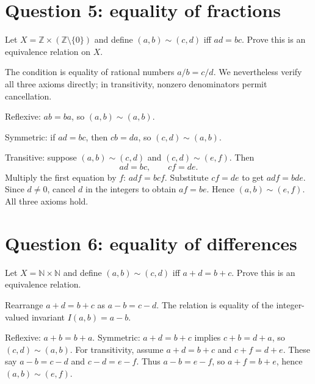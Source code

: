 \documentclass[11pt,openany]{book}
\newcommand{\N}{\mathbb N}\newcommand{\Z}{\mathbb Z}
\begin{document}
\section{Question 5: equality of fractions}
\begin{questionbox}
Let $X=\Z\times(\Z\setminus\{0\})$ and define $(a,b)\sim(c,d)$ iff $ad=bc$. Prove this is an equivalence relation on $X$.
\end{questionbox}
\begin{approachbox}
The condition is equality of rational numbers $a/b=c/d$. We nevertheless verify all three axioms directly; in transitivity, nonzero denominators permit cancellation.
\end{approachbox}
\begin{solutionbox}
Reflexive: $ab=ba$, so $(a,b)\sim(a,b)$.

Symmetric: if $ad=bc$, then $cb=da$, so $(c,d)\sim(a,b)$.

Transitive: suppose $(a,b)\sim(c,d)$ and $(c,d)\sim(e,f)$. Then
\[
ad=bc,\qquad cf=de.
\]
Multiply the first equation by $f$:
$adf=bcf$. Substitute $cf=de$ to get $adf=bde$. Since $d\ne0$, cancel $d$ in the integers to obtain $af=be$. Hence $(a,b)\sim(e,f)$. All three axioms hold.
\end{solutionbox}

\section{Question 6: equality of differences}
\begin{questionbox}
Let $X=\N\times\N$ and define $(a,b)\sim(c,d)$ iff $a+d=b+c$. Prove this is an equivalence relation.
\end{questionbox}
\begin{approachbox}
Rearrange $a+d=b+c$ as $a-b=c-d$. The relation is equality of the integer-valued invariant $I(a,b)=a-b$.
\end{approachbox}
\begin{solutionbox}
Reflexive: $a+b=b+a$. Symmetric: $a+d=b+c$ implies $c+b=d+a$, so $(c,d)\sim(a,b)$. For transitivity, assume
$a+d=b+c$ and $c+f=d+e$. These say $a-b=c-d$ and $c-d=e-f$. Thus $a-b=e-f$, so $a+f=b+e$, hence $(a,b)\sim(e,f)$.
\end{solutionbox}
\end{document}
